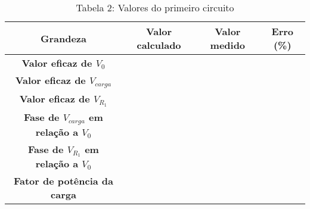 \vspace{5pt}
\begin{table}[h]
\centering
\begin{tabular}{|c|c|c|c|}
\hline
\textbf{Grandeza} & \textbf{Valor calculado} & \textbf{Valor medido} & \textbf{Erro (\%) }\\\hline
\textbf{Valor eficaz de $V_0$} & & & \\\hline
\textbf{Valor eficaz de $V_{carga}$} & & & \\\hline
\textbf{Valor eficaz de $V_{R_1}$} & & & \\\hline
\textbf{Fase de $V_{carga}$ em relação a $V_0$} & & & \\\hline
\textbf{Fase de $V_{R_1}$ em relação a $V_0$} & & & \\\hline
\textbf{Fator de potência da carga} & & & \\\hline
\end{tabular}
\caption*{Tabela 2: Valores do primeiro circuito}
\end{table}